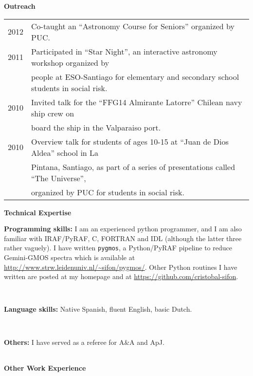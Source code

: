 \documentclass[11pt]{article}
\newcommand\technical[2]{
  \noindent
  \begin{minipage}{0.03\linewidth}
    \null
  \end{minipage}
  \begin{minipage}{0.97\linewidth}
    {\large\bf #1:} #2
  \end{minipage}\\
  }
\begin{document}

\noindent
{\bf\Large Outreach}\\
\vspace{-0.2cm}

\begin{table}[h!]
\begin{tabular}{l l}
2012 & Co-taught an ``Astronomy Course for Seniors'' organized by PUC.\\
2011 & Participated in ``Star Night'', an interactive astronomy workshop organized by\\
     & people at ESO-Santiago for elementary and secondary school students in social risk.\\
2010  & Invited talk for the ``FFG14 Almirante Latorre'' Chilean navy ship crew on\\
      & board the ship in the Valparaiso port.\\
2010  & Overview talk for students of ages 10-15 at ``Juan de Dios Aldea'' school in La\\
      & Pintana, Santiago, as part of a series of presentations called ``The Universe'',\\
      & organized by PUC for students in social risk.\\
\end{tabular}
\end{table}


\noindent
{\bf\Large Technical Expertise}\\

\technical{Programming skills}
          {I am an experienced python programmer, and I am also familiar with IRAF/PyRAF, C, FORTRAN and IDL (although the latter three rather vaguely). I have written {\tt pygmos}, a Python/PyRAF pipeline to reduce Gemini-GMOS spectra which is available at \url{http://www.strw.leidenuniv.nl/\~sifon/pygmos/}. Other Python routines I have written are posted at my homepage and at \url{https://github.com/cristobal-sifon}.}

\vspace{0.1cm}
\technical{Language skills}{Native Spanish, fluent English, basic Dutch.}

\vspace{-0.2cm}
\technical{Others}{I have served as a referee for A\&A and ApJ.}


\vspace{0.4cm}
\noindent
{\bf\Large Other Work Experience}\\
\vspace{-0.2cm}
\end{document}
